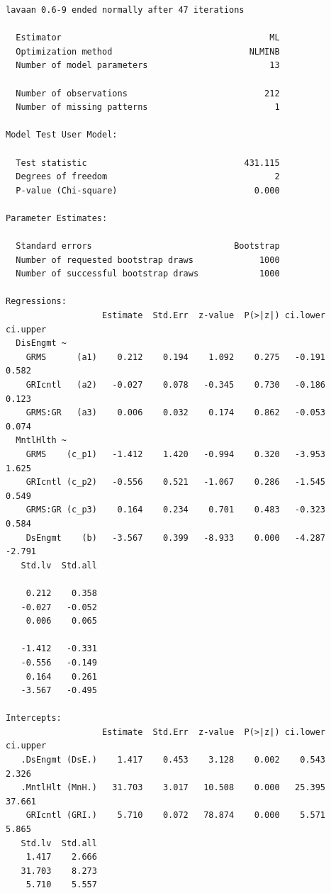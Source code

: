 \documentclass[
  11pt,
]{book}
\begin{document}
\begin{verbatim}
lavaan 0.6-9 ended normally after 47 iterations

  Estimator                                         ML
  Optimization method                           NLMINB
  Number of model parameters                        13
                                                      
  Number of observations                           212
  Number of missing patterns                         1
                                                      
Model Test User Model:
                                                      
  Test statistic                               431.115
  Degrees of freedom                                 2
  P-value (Chi-square)                           0.000

Parameter Estimates:

  Standard errors                            Bootstrap
  Number of requested bootstrap draws             1000
  Number of successful bootstrap draws            1000

Regressions:
                   Estimate  Std.Err  z-value  P(>|z|) ci.lower ci.upper
  DisEngmt ~                                                            
    GRMS      (a1)    0.212    0.194    1.092    0.275   -0.191    0.582
    GRIcntl   (a2)   -0.027    0.078   -0.345    0.730   -0.186    0.123
    GRMS:GR   (a3)    0.006    0.032    0.174    0.862   -0.053    0.074
  MntlHlth ~                                                            
    GRMS    (c_p1)   -1.412    1.420   -0.994    0.320   -3.953    1.625
    GRIcntl (c_p2)   -0.556    0.521   -1.067    0.286   -1.545    0.549
    GRMS:GR (c_p3)    0.164    0.234    0.701    0.483   -0.323    0.584
    DsEngmt    (b)   -3.567    0.399   -8.933    0.000   -4.287   -2.791
   Std.lv  Std.all
                  
    0.212    0.358
   -0.027   -0.052
    0.006    0.065
                  
   -1.412   -0.331
   -0.556   -0.149
    0.164    0.261
   -3.567   -0.495

Intercepts:
                   Estimate  Std.Err  z-value  P(>|z|) ci.lower ci.upper
   .DsEngmt (DsE.)    1.417    0.453    3.128    0.002    0.543    2.326
   .MntlHlt (MnH.)   31.703    3.017   10.508    0.000   25.395   37.661
    GRIcntl (GRI.)    5.710    0.072   78.874    0.000    5.571    5.865
   Std.lv  Std.all
    1.417    2.666
   31.703    8.273
    5.710    5.557


\end{verbatim}
\end{document}
